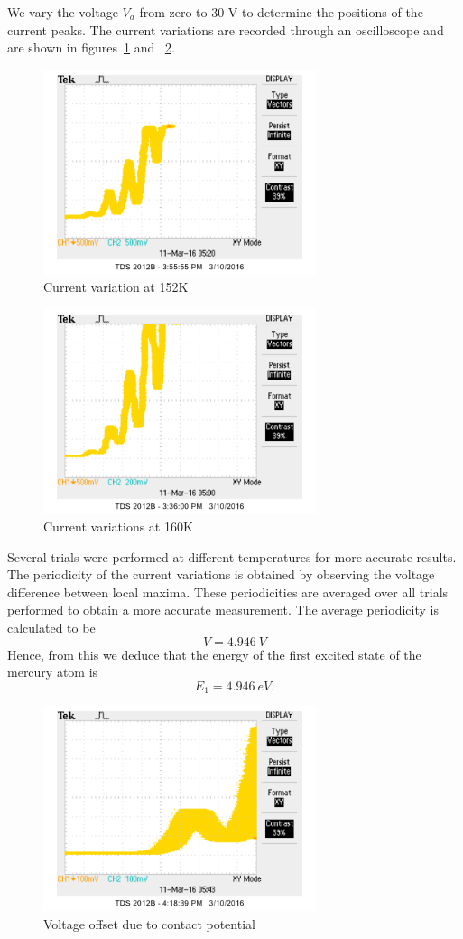 \documentclass[aps, reprint,amsmath,amssymb]{revtex4-1} %
\begin{document}
We vary the voltage $V_a$ from zero to 30 V to determine the positions of the current peaks. The current variations are recorded through an oscilloscope and are shown in figures~\ref{fig:152} and ~\ref{fig:160}. 
\begin{figure}
\centering
\includegraphics[width=8cm]{jb_mp_152.png}
\caption{Current variation at 152K}
\label{fig:152}
\end{figure}
\begin{figure}
\centering
\includegraphics[width=8cm]{jb_mp_160.png}
\caption{Current variations at 160K}
\label{fig:160}
\end{figure}
Several trials were performed at different temperatures for more accurate results. The periodicity of the current variations is obtained by observing the voltage difference between local maxima. These periodicities are averaged over all trials performed to obtain a more accurate measurement. The average periodicity is calculated to be
\[
	V =  \SI{4.946}{V}
\]
Hence, from this we deduce that the energy of the first excited state of the mercury atom is
\[
	E_1 =  \SI{4.946}{eV}.
\]

\begin{figure}
\centering
\includegraphics[width=8cm]{offset.png}
\caption{Voltage offset due to contact potential}
\label{fig:offset}
\end{figure}
\end{document}
